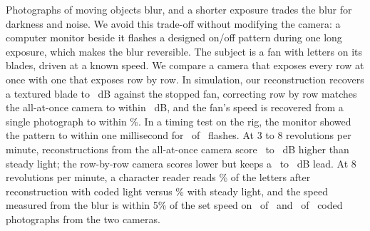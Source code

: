 Photographs of moving objects blur, and a shorter exposure trades the blur for darkness and noise.
We avoid this trade-off without modifying the camera: a computer monitor beside it flashes a designed
on/off pattern during one long exposure, which makes the blur reversible. The subject is a fan with
letters on its blades, driven at a known speed. We compare a camera that exposes every row at once
with one that exposes row by row. In simulation, our reconstruction recovers a textured blade to
\psnrGsTex~dB against the stopped fan, correcting row by row matches the all-at-once camera to within
\rowsMaxMeanGapA~dB, and the fan's speed is recovered from a single photograph to within
\speedErrTex\%. In a timing test on the rig, the monitor showed the pattern to within one millisecond for
\realWithinOneMs~of \realBits~flashes. At 3 to 8 revolutions per minute, reconstructions from the
all-at-once camera score \rigGapMin~to \rigGapMax~dB higher than steady light; the row-by-row camera
scores lower but keeps a \rigRsGapMin~to \rigRsGapMax~dB lead. At 8 revolutions per minute, a character
reader reads \rigReadCodedEight\% of the letters after reconstruction with coded light versus
\rigReadSteadyEight\% with steady light, and the speed measured from the blur is within 5\% of the set
speed on \rigSpeedWithinCoded~of \rigSpeedAllCoded~and \rigSpeedWithinRsCoded~of \rigSpeedAllRsCoded~coded
photographs from the two cameras.